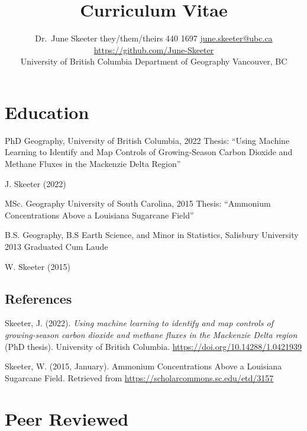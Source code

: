 \documentclass[
]{article}
\title{ \vspace{-1.5em}
\bf Curriculum Vitae \vspace{-.5em}
}
\author{
      {Dr.~June Skeeter 
    \authorcr %
    they/them/theirs
    \authorcr
    604 440 1697
    \authorcr
    \href{mailto:june.skeeter@ubc.ca}{june.skeeter@ubc.ca}}
    \authorcr
    \href{https://github.com/June-Skeeter}{https://github.com/June-Skeeter}
    

          University of British Columbia
      \authorcr
      Department of Geography
      \authorcr
      Vancouver, BC 
      }
\date{}
\newlength{\cslhangindent}
\newlength{\cslentryspacingunit} %
\newenvironment{CSLReferences}[2] %
 {%
  \setlength{\parindent}{0pt}
  \ifodd #1
  \let\oldpar\par
  \def\par{\hangindent=\cslhangindent\oldpar}
  \fi
  \setlength{\parskip}{#2\cslentryspacingunit}
 }%
 {}
\begin{document}
\maketitle
\ifdefined\Shaded\renewenvironment{Shaded}{\begin{tcolorbox}[frame hidden, boxrule=0pt, borderline west={3pt}{0pt}{shadecolor}, breakable, enhanced, interior hidden, sharp corners]}{\end{tcolorbox}}\fi

\hypertarget{education}{%
\section{Education}\label{education}}

PhD Geography, University of British Columbia, 2022 Thesis: ``Using
Machine Learning to Identify and Map Controls of Growing-Season Carbon
Dioxide and Methane Fluxes in the Mackenzie Delta Region''

J. Skeeter (2022)

MSc. Geography University of South Carolina, 2015 Thesis: ``Ammonium
Concentrations Above a Louisiana Sugarcane Field''

B.S. Geography, B.S Earth Science, and Minor in Statistics, Salisbury
University 2013 Graduated Cum Laude

W. Skeeter (2015)

\hypertarget{bibliography-1}{%
\subsection*{References}\label{bibliography-1}}

\hypertarget{refs-1}{}
\begin{CSLReferences}{1}{0}
\leavevmode{}%
Skeeter, J. (2022). \emph{Using machine learning to identify and map
controls of growing-season carbon dioxide and methane fluxes in the
{Mackenzie} {Delta} region} (PhD thesis). University of British
Columbia. \url{https://doi.org/10.14288/1.0421939}

\leavevmode{}%
Skeeter, W. (2015, January). Ammonium {Concentrations} {Above} a
{Louisiana} {Sugarcane} {Field}. Retrieved from
\url{https://scholarcommons.sc.edu/etd/3157}

\end{CSLReferences}

\hypertarget{peer-reviewed}{%
\section{Peer Reviewed}\label{peer-reviewed}}
\end{document}
